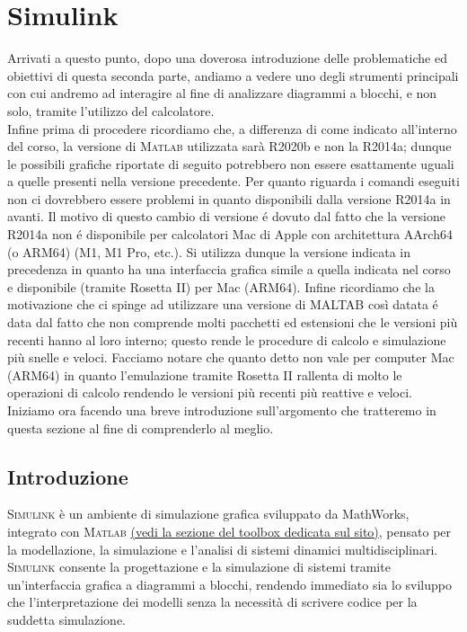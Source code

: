 \documentclass[../main.tex]{subfiles}
\begin{document}
\clearpage
\thispagestyle{empty}
\vspace*{7cm}
\section{Simulink}
\vspace*{1.5cm}


Arrivati a questo punto, dopo una doverosa introduzione delle problematiche ed obiettivi di questa seconda parte, andiamo a vedere uno degli strumenti principali con cui andremo ad interagire al fine di analizzare diagrammi a blocchi, e non solo, tramite l'utilizzo del calcolatore.\\

Infine prima di procedere ricordiamo che, a differenza di come indicato all'interno del corso, la versione di \textsc{Matlab} utilizzata sarà R2020b e non la R2014a; dunque le possibili grafiche riportate di seguito potrebbero non essere esattamente uguali a quelle presenti nella versione precedente.
Per quanto riguarda i comandi eseguiti non ci dovrebbero essere problemi in quanto disponibili dalla versione R2014a in avanti.
Il motivo di questo cambio di versione é dovuto dal fatto che la versione R2014a non é disponibile per calcolatori Mac di Apple con architettura AArch64 (o ARM64) (M1, M1 Pro, etc.). Si utilizza dunque la versione indicata in precedenza in quanto ha una interfaccia grafica simile a quella indicata nel corso e disponibile (tramite Rosetta II) per Mac (ARM64).
Infine ricordiamo che la motivazione che ci spinge ad utilizzare una versione di MALTAB così datata é data dal fatto che non comprende molti pacchetti ed estensioni che le versioni più recenti hanno al loro interno; questo rende le procedure di calcolo e simulazione più snelle e veloci. Facciamo notare che quanto detto non vale per computer Mac (ARM64) in quanto l'emulazione tramite Rosetta II rallenta di molto le operazioni di calcolo rendendo le versioni più recenti più reattive e veloci.\\

Iniziamo ora facendo una breve introduzione sull'argomento che tratteremo in questa sezione al fine di comprenderlo al meglio.

\subsection{Introduzione}

\textsc{Simulink} è un ambiente di simulazione grafica sviluppato da MathWorks, integrato con \textsc{Matlab} \href{https://it.mathworks.com/products/simulink.html}{(vedi la sezione del toolbox dedicata sul sito)}, pensato per la modellazione, la simulazione e l’analisi di sistemi dinamici multidisciplinari. \textsc{Simulink} consente la progettazione e la simulazione di sistemi tramite un’interfaccia grafica a diagrammi a blocchi, rendendo immediato sia lo sviluppo che l'interpretazione dei modelli senza la necessità di scrivere codice per la suddetta simulazione.
\end{document}
